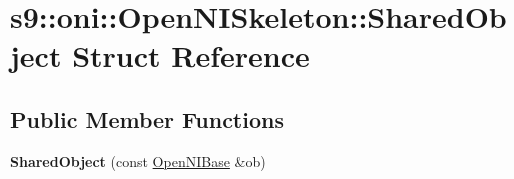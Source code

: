 \hypertarget{structs9_1_1oni_1_1OpenNISkeleton_1_1SharedObject}{\section{s9\-:\-:oni\-:\-:\-Open\-N\-I\-Skeleton\-:\-:\-Shared\-Object \-Struct \-Reference}
\label{structs9_1_1oni_1_1OpenNISkeleton_1_1SharedObject}
}
\subsection*{\-Public \-Member \-Functions}
\begin{DoxyCompactItemize}
\item 
\hypertarget{structs9_1_1oni_1_1OpenNISkeleton_1_1SharedObject_a281c15b434d091ebd05d21b7fd64e7d9}{{\bfseries \-Shared\-Object} (const \hyperlink{classs9_1_1oni_1_1OpenNIBase}{\-Open\-N\-I\-Base} \&ob)}\label{structs9_1_1oni_1_1OpenNISkeleton_1_1SharedObject_a281c15b434d091ebd05d21b7fd64e7d9}

\end{DoxyCompactItemize}
